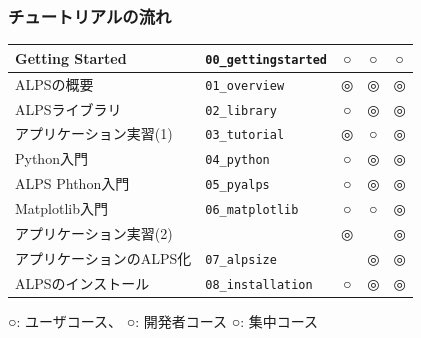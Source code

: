 \begin{frame}
  \frametitle{チュートリアルの流れ}
  \begin{tabular}{|l|l|c|c|c|}
        \hline
        Getting Started & {\tt 00\_gettingstarted} & {\footnotesize\color{red} ○} & {\footnotesize\color{blue} ○} & {\footnotesize\color{green} ○} \\
        \hline
        ALPSの概要 & {\tt 01\_overview} & {\footnotesize\color{red} ◎} & {\footnotesize\color{blue} ◎} & {\footnotesize\color{green} ◎} \\
        \hline
        ALPSライブラリ & {\tt 02\_library} & {\footnotesize\color{red} ○} & {\footnotesize\color{blue} ◎} & {\footnotesize\color{green} ◎} \\
        \hline
        アプリケーション実習(1) & {\tt 03\_tutorial} & {\footnotesize\color{red} ◎} & {\footnotesize\color{blue} ○} & {\footnotesize\color{green} ◎} \\
        \hline
        Python入門 & {\tt 04\_python} & {\footnotesize\color{red} ○} & {\footnotesize\color{blue} ◎} & {\footnotesize\color{green} ◎} \\
        \hline
        ALPS Phthon入門 & {\tt 05\_pyalps} & {\footnotesize\color{red} ○} & {\footnotesize\color{blue} ◎} & {\footnotesize\color{green} ◎} \\
        \hline
        Matplotlib入門 & {\tt 06\_matplotlib} & {\footnotesize\color{red} ○} & {\footnotesize\color{blue} ○} & {\footnotesize\color{green} ◎} \\
        \hline
        アプリケーション実習(2) & & {\footnotesize\color{red} ◎} & {\footnotesize\color{blue} } & {\footnotesize\color{green} ◎} \\
        \hline
        アプリケーションのALPS化 & {\tt 07\_alpsize} & {\footnotesize\color{red} } & {\footnotesize\color{blue} ◎} & {\footnotesize\color{green} ◎} \\
        \hline
        ALPSのインストール & {\tt 08\_installation} & {\footnotesize\color{red} ○} & {\footnotesize\color{blue} ◎} & {\footnotesize\color{green} ◎} \\
        \hline
  \end{tabular}
  
  {\footnotesize\color{red} ○}: ユーザコース、{\footnotesize\color{blue} ○}: 開発者コース {\footnotesize\color{green} ○}: 集中コース
\end{frame}

